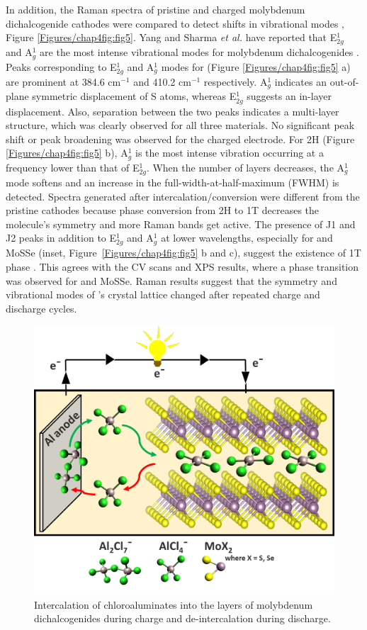 In addition, the Raman spectra of pristine and charged molybdenum dichalcogenide cathodes were compared to detect shifts in vibrational modes , Figure \ref{Figures/chap4fig:fig5}. Yang and Sharma \textit{et al.} have reported that E$^1_{2g}$ and A$^1_g$ are the most intense vibrational modes for molybdenum dichalcogenides \cite{yang_pressure-induced_2019, sharma_stable_2018}. Peaks corresponding to E$^1_{2g}$ and A$^1_g$ modes for  (Figure \ref{Figures/chap4fig:fig5} a) are prominent at 384.6 cm$^{-1}$ and 410.2 cm$^{-1}$ respectively. A$^1_g$ indicates an out-of-plane symmetric displacement of S atoms, whereas E$^1_{2g}$ suggests an in-layer displacement. Also, separation between the two peaks indicates a multi-layer structure, which was clearly observed for all three materials. No significant peak shift or peak broadening was observed for the charged  electrode. For 2H  (Figure \ref{Figures/chap4fig:fig5} b), A$^1_g$ is the most intense vibration occurring at a frequency lower than that of E$^1_{2g}$. When the number of layers decreases, the A$^1_g$ mode softens and an increase in the full-width-at-half-maximum (FWHM) is detected. Spectra generated after intercalation/conversion were different from the pristine cathodes because phase conversion from 2H to 1T decreases the molecule's symmetry and more Raman bands get active. The presence of J1 and J2 peaks in addition to E$^1_{2g}$ and A$^1_g$ at lower wavelengths, especially for  and MoSSe (inset, Figure\ \ref{Figures/chap4fig:fig5} b and c), suggest the existence of 1T phase . This agrees with the CV scans and XPS results, where a phase transition was observed for  and MoSSe. Raman results suggest that the symmetry and vibrational modes of 's crystal lattice changed after repeated charge and discharge cycles. 
\begin{figure}
  \centering
  \includegraphics[width=\textwidth]{Figures/chap4fig/graabs}
  \caption{Intercalation of chloroaluminates into the layers of molybdenum dichalcogenides during charge and de-intercalation during discharge.}
  \label{Figures/chap4fig:graabs}
\end{figure}
